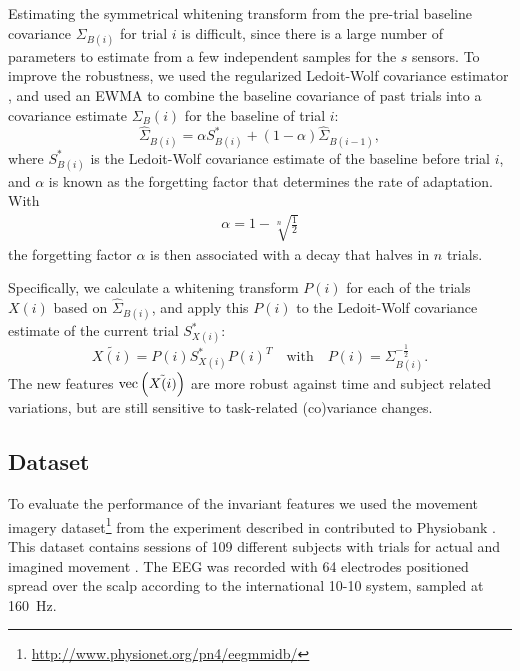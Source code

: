 \begin{sloppypar}
Estimating the symmetrical whitening transform from the pre-trial baseline
covariance $\Sigma_{B(i)}$ for trial $i$ is difficult, since there is a large
number of parameters to estimate from a few independent samples for the $s$
sensors. To improve the robustness, we used the regularized Ledoit-Wolf
covariance estimator \cite{ledoit2004wce}, and used an \ac{EWMA} to combine the
baseline covariance of past trials into a covariance estimate $\Sigma_B(i)$
for the baseline of trial $i$:
%
\begin{equation} 
  \hat\Sigma_{B(i)} = \alpha S^*_{B(i)} + (1 - \alpha) \hat\Sigma_{B(i-1)}, 
\end{equation} 
%
where $S^*_{B(i)}$ is the Ledoit-Wolf covariance estimate of the baseline before
trial $i$, and $\alpha$ is known as the forgetting factor that determines the
rate of adaptation. With 
\begin{align}
  \alpha = 1-\sqrt[n]{\tfrac{1}{2}}
\end{align}
%
the forgetting factor $\alpha$ is then associated with a decay that halves in
$n$ trials.
\end{sloppypar}

Specifically, we calculate a whitening transform $P(i)$ for each of
the trials $X(i)$ based on $\hat\Sigma_{B(i)}$, and apply this $P(i)$ to the Ledoit-Wolf covariance estimate of
the current trial $S^*_{X(i)}$:
%
\begin{equation}
\tilde{X(i)} = P(i) S^*_{X(i)} P(i)^T \quad \text{with} \quad 
  P(i) = \Sigma_{B(i)}^{-\frac{1}{2}}.
\end{equation}
The new features $\operatorname{vec} \left(\tilde{X(i)}\right)$ are more robust against time
and subject related variations, but are still sensitive to task-related (co)variance changes.

\subsection{Dataset}
To evaluate the performance of the invariant features we used the movement
imagery dataset\footnote{\url{http://www.physionet.org/pn4/eegmmidb/}} from the
experiment described in \cite{schalk2004bgp} contributed to Physiobank
\cite{goldberger2000ppp}. This dataset contains sessions of 109 different
subjects with trials for actual and imagined movement \cite{schalk2011pc}.
The \ac{EEG} was recorded with 64 electrodes positioned spread over the scalp according to the international 10-10 system, sampled at 160~Hz.

